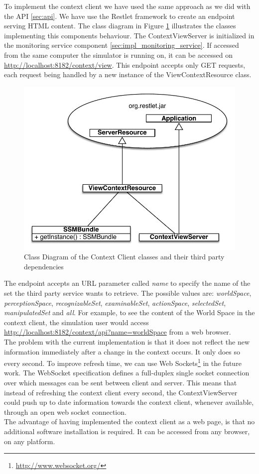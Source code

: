To implement the context client we have used the same approach as we did with the API \ref{sec:api}. We have use the Restlet framework to create an endpoint serving HTML content. The class diagram in Figure \ref{fig:impl_context_client_class} illustrates the classes implementing this components behaviour. The ContextViewServer is initialized in the monitoring service component \ref{sec:impl_monitoring_service}. If accessed from the same computer the simulator is running on, it can be accessed on \url{http://localhost:8182/context/view}. This endpoint accepts only GET requests, each request being handled by a new instance of the ViewContextResource class.
\begin{figure}[H]
	\centering
	\includegraphics[width=\linewidth]{gfx/Chapter4/context_client_class}
	\caption{Class Diagram of the Context Client classes and their third party dependencies}
	\label{fig:impl_context_client_class}
\end{figure}

The endpoint accepts an URL parameter called \emph{name} to specify the name of the set the third party service wants to retrieve. The possible values are: \emph{worldSpace}, \emph{perceptionSpace}, \emph{recognizableSet}, \emph{examinableSet}, \emph{actionSpace}, \emph{selectedSet}, \emph{manipulatedSet} and \emph{all}. For example, to see the content of the World Space in the context client, the simulation user would access \url{http://localhost:8182/context/api?name=worldSpace} from a web browser.\\

The problem with the current implementation is that it does not reflect the new information immediately after a change in the context occurs. It only does so every second. To improve refresh time, we can use Web Sockets\footnote{\url{http://www.websocket.org/}} in the future work. The WebSocket specification defines a full-duplex single socket connection over which messages can be sent between client and server. This means that instead of refreshing the context client every second, the ContextViewServer could push up to date information towards the context client, whenever available, through an open web socket connection.\\

The advantage of having implemented the context client as a web page, is that no additional software installation is required. It can be accessed from any browser, on any platform.

